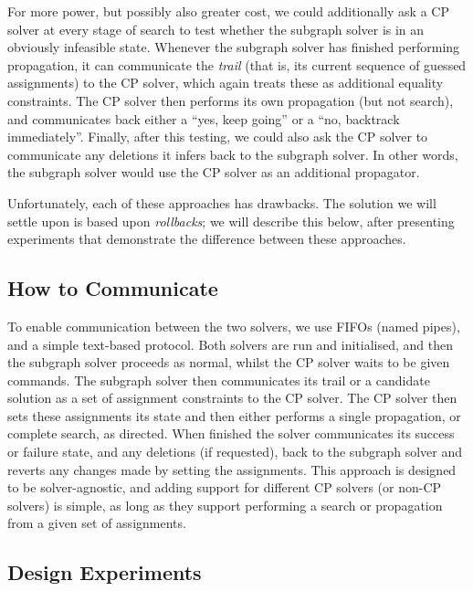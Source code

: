 \documentclass[runningheads]{llncs}
\begin{document}
For more power, but possibly also greater cost, we could additionally ask a CP solver at every stage
of search to test whether the subgraph solver is in an obviously infeasible state.  Whenever the
subgraph solver has finished performing propagation, it can communicate the \emph{trail} (that is,
its current sequence of guessed assignments) to the CP solver, which again treats these as
additional equality constraints. The CP solver then performs its own propagation (but not search),
and communicates back either a ``yes, keep going'' or a ``no, backtrack immediately''.  Finally,
after this testing, we could also ask the CP solver to communicate any deletions it infers back to
the subgraph solver. In other words, the subgraph solver would use the CP solver as an additional
propagator.

Unfortunately, each of these approaches has drawbacks. The solution we will settle upon is based
upon \emph{rollbacks}; we will describe this below, after presenting experiments that demonstrate
the difference between these approaches.

\subsection{How to Communicate}

To enable communication between the two solvers, we use FIFOs (named pipes), and a simple text-based
protocol.  Both solvers are run and initialised, and then the subgraph solver proceeds as normal,
whilst the CP solver waits to be given commands. The subgraph solver then communicates its trail or
a candidate solution as a set of assignment constraints to the CP solver. The CP solver then sets
these assignments its state and then either performs a single propagation, or complete search, as
directed. When finished the solver communicates its success or failure state, and any deletions (if
requested), back to the subgraph solver and reverts any changes made by setting the assignments.
This approach is designed to be solver-agnostic, and adding support for different CP solvers (or
non-CP solvers) is simple, as long as they support performing a search or propagation from a given
set of assignments.

\subsection{Design Experiments}
\end{document}
